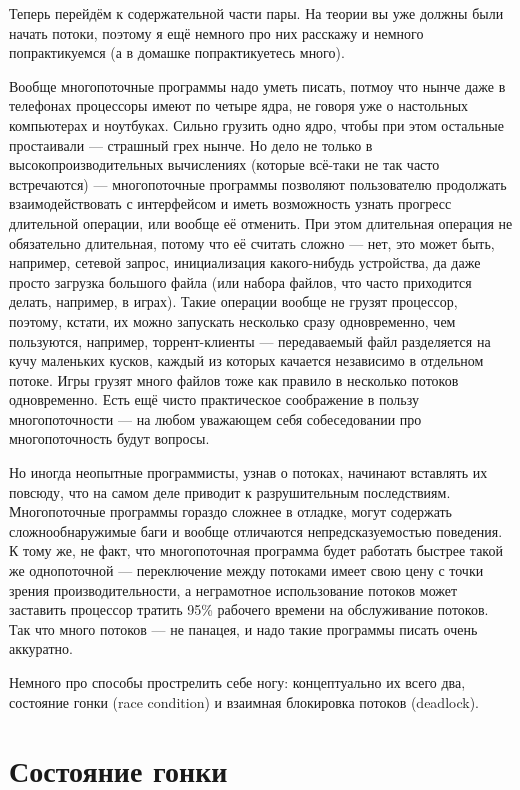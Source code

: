 \documentclass[a5paper]{article}
\begin{document}
Теперь перейдём к содержательной части пары. На теории вы уже должны были начать потоки, поэтому я ещё немного про них расскажу и немного попрактикуемся (а в домашке попрактикуетесь много).

Вообще многопоточные программы надо уметь писать, потмоу что нынче даже в телефонах процессоры имеют по четыре ядра, не говоря уже о настольных компьютерах и ноутбуках. Сильно грузить одно ядро, чтобы при этом остальные простаивали --- страшный грех нынче. Но дело не только в высокопроизводительных вычислениях (которые всё-таки не так часто встречаются) --- многопоточные программы позволяют пользователю продолжать взаимодействовать с интерфейсом и иметь возможность узнать прогресс длительной операции, или вообще её отменить. При этом длительная операция не обязательно длительная, потому что её считать сложно --- нет, это может быть, например, сетевой запрос, инициализация какого-нибудь устройства, да даже просто загрузка большого файла (или набора файлов, что часто приходится делать, например, в играх). Такие операции вообще не грузят процессор, поэтому, кстати, их можно запускать несколько сразу одновременно, чем пользуются, например, торрент-клиенты --- передаваемый файл разделяется на кучу маленьких кусков, каждый из которых качается независимо в отдельном потоке. Игры грузят много файлов тоже как правило в несколько потоков одновременно. Есть ещё чисто практическое соображение в пользу многопоточности --- на любом уважающем себя собеседовании про многопоточность будут вопросы.

Но иногда неопытные программисты, узнав о потоках, начинают вставлять их повсюду, что на самом деле приводит к разрушительным последствиям. Многопоточные программы гораздо сложнее в отладке, могут содержать сложнообнаружимые баги и вообще отличаются непредсказуемостью поведения. К тому же, не факт, что многопоточная программа будет работать быстрее такой же однопоточной --- переключение между потоками имеет свою цену с точки зрения производительности, а неграмотное использование потоков может заставить процессор тратить 95\% рабочего времени на обслуживание потоков. Так что много потоков --- не панацея, и надо такие программы писать очень аккуратно.

Немного про способы прострелить себе ногу: концептуально их всего два, состояние гонки (race condition) и взаимная блокировка потоков (deadlock).

\section{Состояние гонки}
\end{document}
